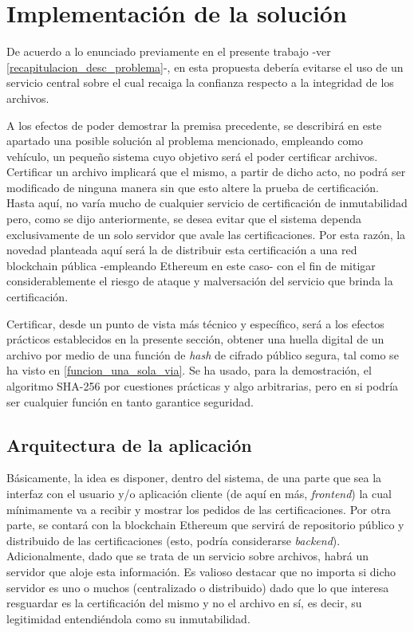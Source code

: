 \section{Implementación de la solución}
\label{imp_solucion}

De acuerdo a lo enunciado previamente en el presente trabajo -ver \ref{recapitulacion_desc_problema}-, en esta propuesta debería evitarse el uso de un servicio central sobre el cual recaiga la confianza respecto a la integridad de los archivos.

A los efectos de poder demostrar la premisa precedente, se describirá en este apartado una posible solución al problema mencionado, empleando como vehículo, un pequeño sistema cuyo objetivo será el poder certificar archivos. Certificar un archivo implicará que el mismo, a partir de dicho acto, no podrá ser modificado de ninguna manera sin que esto altere la prueba de certificación. Hasta aquí, no varía mucho de cualquier servicio de certificación de inmutabilidad pero, como se dijo anteriormente, se desea evitar que el sistema dependa exclusivamente de un solo servidor que avale las certificaciones. Por esta razón, la novedad planteada aquí será la de distribuir esta certificación a una red blockchain pública -empleando Ethereum en este caso- con el fin de mitigar considerablemente el riesgo de ataque y malversación del servicio que brinda la certificación.

Certificar, desde un punto de vista más técnico y específico, será a los efectos prácticos establecidos en la presente sección, obtener una huella digital de un archivo por medio de una función de \textit{hash} de cifrado público segura, tal como se ha visto en \ref{funcion_una_sola_via}. Se ha usado, para la demostración, el algoritmo SHA-256 por cuestiones prácticas y algo arbitrarias, pero en si podría ser cualquier función en tanto garantice seguridad.

\subsection{Arquitectura de la aplicación}

Básicamente, la idea es disponer, dentro del sistema, de una parte que sea la interfaz con el usuario y/o aplicación cliente (de aquí en más, \textit{frontend}) la cual mínimamente va a recibir y mostrar los pedidos de las certificaciones. Por otra parte, se contará con la blockchain Ethereum que servirá de repositorio público y distribuido de las certificaciones (esto, podría considerarse \textit{backend}). Adicionalmente, dado que se trata de un servicio sobre archivos, habrá un servidor que aloje esta información. Es valioso destacar que no importa si dicho servidor es uno o muchos (centralizado o distribuido) dado que lo que interesa resguardar es la certificación del mismo y no el archivo en sí, es decir, su legitimidad entendiéndola como su inmutabilidad.

